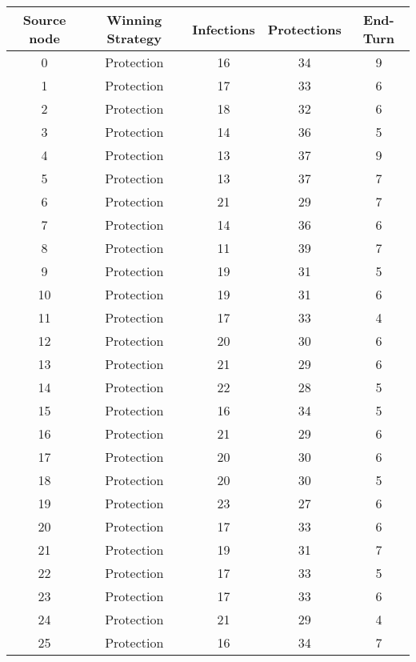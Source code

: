 \documentclass[results.tex]{subfiles}
\begin{document}
\begin{center}
  \begin{tabular}{| c || c | c | c | c |}
    \hline
    {\bfseries Source node} & {\bfseries Winning Strategy} & {\bfseries Infections} & {\bfseries Protections} & {\bfseries End-Turn} \\  %
    \hline\hline
    0 & Protection & 16 & 34 & 9 \\ 
    \hline
    1 & Protection & 17 & 33 & 6 \\ 
    \hline
    2 & Protection & 18 & 32 & 6 \\ 
    \hline
    3 & Protection & 14 & 36 & 5 \\ 
    \hline
    4 & Protection & 13 & 37 & 9 \\ 
    \hline
    5 & Protection & 13 & 37 & 7 \\ 
    \hline
    6 & Protection & 21 & 29 & 7 \\ 
    \hline
    7 & Protection & 14 & 36 & 6 \\ 
    \hline
    8 & Protection & 11 & 39 & 7 \\ 
    \hline
    9 & Protection & 19 & 31 & 5 \\ 
    \hline
    10 & Protection & 19 & 31 & 6 \\ 
    \hline
    11 & Protection & 17 & 33 & 4 \\ 
    \hline
    12 & Protection & 20 & 30 & 6 \\ 
    \hline
    13 & Protection & 21 & 29 & 6 \\ 
    \hline
    14 & Protection & 22 & 28 & 5 \\ 
    \hline
    15 & Protection & 16 & 34 & 5 \\ 
    \hline
    16 & Protection & 21 & 29 & 6 \\ 
    \hline
    17 & Protection & 20 & 30 & 6 \\ 
    \hline
    18 & Protection & 20 & 30 & 5 \\ 
    \hline
    19 & Protection & 23 & 27 & 6 \\ 
    \hline
    20 & Protection & 17 & 33 & 6 \\ 
    \hline
    21 & Protection & 19 & 31 & 7 \\ 
    \hline
    22 & Protection & 17 & 33 & 5 \\ 
    \hline
    23 & Protection & 17 & 33 & 6 \\ 
    \hline
    24 & Protection & 21 & 29 & 4 \\ 
    \hline
    25 & Protection & 16 & 34 & 7 \\ 

\end{tabular}
\end{center}
\end{document}
